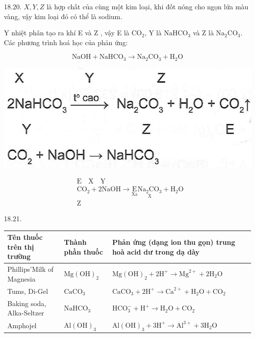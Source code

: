 \documentclass[10pt]{article}
\begin{document}
18.20. $X, Y, Z$ là hợp chất của cùng một kim loại, khi đốt nóng cho ngọn lửa màu vàng, vậy kim loại đó có thể là sodium.

Y nhiệt phân tạo ra khí E và Z , vậy E là $\mathrm{CO}_{2}$, Y là $\mathrm{NaHCO}_{3}$ và Z là $\mathrm{Na}_{2} \mathrm{CO}_{3}$.\\
Các phương trình hoá học của phản ứng:

$$
\mathrm{NaOH}+\mathrm{NaHCO}_{3} \rightarrow \mathrm{Na}_{2} \mathrm{CO}_{3}+\mathrm{H}_{2} \mathrm{O}
$$

\begin{center}
\includegraphics[max width=\textwidth]{2025_10_23_b4e16b74380d0f7e7700g-104}
\end{center}

$$
\begin{aligned}
& \mathrm{E} \quad \mathrm{X} \quad \mathrm{Y} \\
& \mathrm{CO}_{2}+2 \mathrm{NaOH} \rightarrow \underset{\mathrm{Xa}}{\mathrm{E}} \underset{\mathrm{X}}{\mathrm{Na}_{2} \mathrm{CO}_{3}}+\mathrm{H}_{2} \mathrm{O} \\
& \mathrm{Z}
\end{aligned}
$$

18.21.

\begin{center}
\begin{tabular}{|l|l|l|}
\hline
Tên thuốc trên thị trường & Thành phần thuốc & Phản ứng (dạng ion thu gọn) trung hoà acid dư trong dạ dày \\
\hline
Phillips'Milk of Magnesia & $\mathrm{Mg}(\mathrm{OH})_{2}$ & $\mathrm{Mg}(\mathrm{OH})_{2}+2 \mathrm{H}^{+} \rightarrow \mathrm{Mg}^{2+}+2 \mathrm{H}_{2} \mathrm{O}$ \\
\hline
Tums, Di-Gel & $\mathrm{CaCO}_{3}$ & $\mathrm{CaCO}_{3}+2 \mathrm{H}^{+} \rightarrow \mathrm{Ca}^{2+}+\mathrm{H}_{2} \mathrm{O}+\mathrm{CO}_{2}$ \\
\hline
Baking soda, Alka-Seltzer & $\mathrm{NaHCO}_{3}$ & $\mathrm{HCO}_{3}^{-}+\mathrm{H}^{+} \rightarrow \mathrm{H}_{2} \mathrm{O}+\mathrm{CO}_{2}$ \\
\hline
Amphojel & $\mathrm{Al}(\mathrm{OH})_{3}$ & $\mathrm{Al}(\mathrm{OH})_{3}+3 \mathrm{H}^{+} \rightarrow \mathrm{Al}^{3+}+3 \mathrm{H}_{2} \mathrm{O}$ \\
\hline
\end{tabular}
\end{center}
\end{document}
